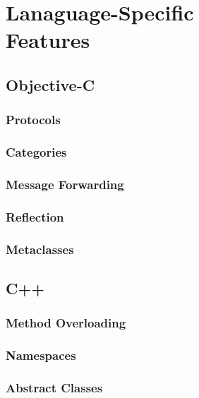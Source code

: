 \documentclass[11pt, a4paper, twocolumn]{article}
\begin{document}
\section{Lanaguage-Specific \\ Features}
\subsection{Objective-C}
\subsubsection{Protocols}
\label{sec:protocol}

\subsubsection{Categories}
\label{sec:categories}

\subsubsection{Message Forwarding}
\label{sec:message}

\subsubsection{Reflection}
\label{sec:reflection}

\subsubsection{Metaclasses}
\label{sec:meta}

\subsection{C++}
\subsubsection{Method Overloading}
\label{sec:overloading}

\subsubsection{Namespaces}
\label{sec:namespaces}

\subsubsection{Abstract Classes}
\label{sec:abstract}
\end{document}

